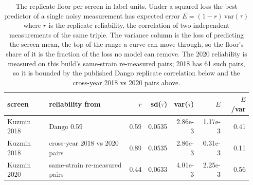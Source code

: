 
\begin{table}[htbp]
\centering\footnotesize
\caption{The replicate floor per screen in label units. Under a squared loss the best predictor of a single noisy measurement has expected error $E = (1 - r)\,\mathrm{var}(\tau)$ where $r$ is the replicate reliability, the correlation of two independent measurements of the same triple. The variance column is the loss of predicting the screen mean, the top of the range a curve can move through, so the floor's share of it is the fraction of the loss no model can remove. The 2020 reliability is measured on this build's same-strain re-measured pairs; 2018 has 61 such pairs, so it is bounded by the published Dango replicate correlation below and the cross-year 2018 vs 2020 pairs above.}
\label{tab:floors}
\begin{tabular}{llrrrrr}
\toprule
screen & reliability from & $r$ & sd($\tau$) & var($\tau$) & $E$ & $E$/var \\
\midrule
Kuzmin 2018 & Dango 0.59 & 0.59 & 0.0535 & 2.86e-3 & 1.17e-3 & 0.41 \\
Kuzmin 2018 & cross-year 2018 vs 2020 pairs & 0.89 & 0.0535 & 2.86e-3 & 0.31e-3 & 0.11 \\
Kuzmin 2020 & same-strain re-measured pairs & 0.44 & 0.0633 & 4.01e-3 & 2.25e-3 & 0.56 \\
\bottomrule
\end{tabular}
\end{table}
